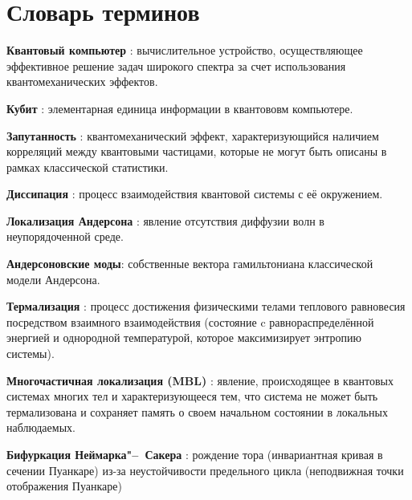 \chapter*{Словарь терминов}             %

\textbf{Квантовый компьютер} : вычислительное устройство, осуществляющее эффективное решение задач широкого спектра за счет использования квантомеханических эффектов.

\textbf{Кубит} : элементарная единица информации в квантововм компьютере.

\textbf{Запутанность} : квантомеханический эффект, характеризующийся наличием корреляций между квантовыми частицами, которые не могут быть описаны в рамках классической статистики.

\textbf{Диссипация} : процесс взаимодействия квантовой системы с её окружением.

\textbf{Локализация Андерсона} : явление отсутствия диффузии волн в неупорядоченной среде.

\textbf{Андерсоновские моды}: собственные вектора гамильтониана классической модели Андерсона. 

\textbf{Термализация} : процесс достижения физическими телами теплового равновесия посредством взаимного взаимодействия (состояние c равнораспределённой энергией и однородной температурой, которое максимизирует энтропию системы). 

\textbf{Многочастичная локализация (MBL)} : явление, происходящее в квантовых системах многих тел и характеризующееся тем, что система не может быть термализована и сохраняет память о своем начальном состоянии в локальных наблюдаемых.

\textbf{Бифуркация Неймарка"--~Сакера} : рождение тора (инвариантная кривая в сечении Пуанкаре) из-за неустойчивости предельного цикла (неподвижная точки отображения Пуанкаре)


